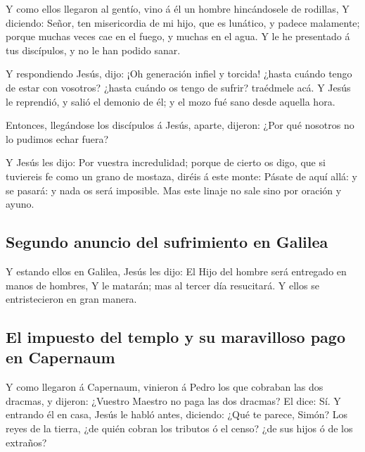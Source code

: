  Y como ellos llegaron al gentío, vino á él un hombre
hincándosele de rodillas,  Y diciendo: Señor, ten
misericordia de mi hijo, que es lunático, y padece malamente; porque
muchas veces cae en el fuego, y muchas en el agua.  Y le
he presentado á tus discípulos, y no le han podido sanar.

 Y respondiendo Jesús, dijo: ¡Oh generación infiel y
torcida! ¿hasta cuándo tengo de estar con vosotros? ¿hasta cuándo os
tengo de sufrir? traédmele acá.  Y Jesús le reprendió, y
salió el demonio de él; y el mozo fué sano desde aquella hora.

 Entonces, llegándose los discípulos á Jesús, aparte,
dijeron: ¿Por qué nosotros no lo pudimos echar fuera?

 Y Jesús les dijo: Por vuestra incredulidad; porque de
cierto os digo, que si tuviereis fe como un grano de mostaza, diréis á
este monte: Pásate de aquí allá: y se pasará: y nada os será imposible.
 Mas este linaje no sale sino por oración y ayuno.

\hypertarget{segundo-anuncio-del-sufrimiento-en-galilea}{%
\subsection{Segundo anuncio del sufrimiento en
Galilea}\label{segundo-anuncio-del-sufrimiento-en-galilea}}

 Y estando ellos en Galilea, Jesús les dijo: El Hijo del
hombre será entregado en manos de hombres,  Y le matarán;
mas al tercer día resucitará. Y ellos se entristecieron en gran manera.

\hypertarget{el-impuesto-del-templo-y-su-maravilloso-pago-en-capernaum}{%
\subsection{El impuesto del templo y su maravilloso pago en
Capernaum}\label{el-impuesto-del-templo-y-su-maravilloso-pago-en-capernaum}}

 Y como llegaron á Capernaum, vinieron á Pedro los que
cobraban las dos dracmas, y dijeron: ¿Vuestro Maestro no paga las dos
dracmas?  El dice: Sí. Y entrando él en casa, Jesús le
habló antes, diciendo: ¿Qué te parece, Simón? Los reyes de la tierra,
¿de quién cobran los tributos ó el censo? ¿de sus hijos ó de los
extraños?

